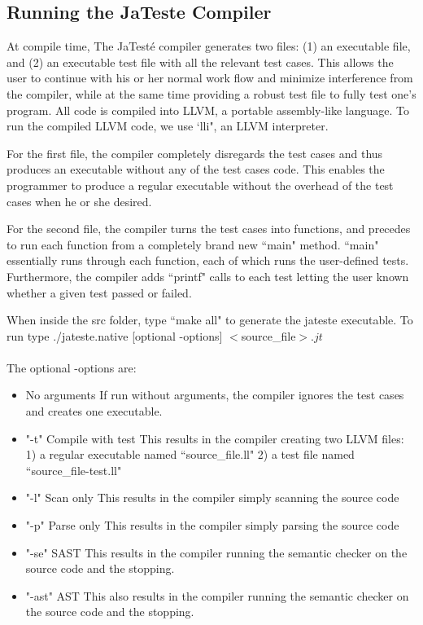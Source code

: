 \documentclass{article}
\begin{document}
\subsection{Running the JaTeste Compiler}
At compile time, The JaTest\'{e} compiler generates two files: (1) an executable file, and (2) an executable test file with all the relevant test cases.  This allows the user to continue with his or her normal work flow and minimize interference from the compiler, while at the same time providing a robust test file to fully test one's program. All code is compiled into LLVM, a portable assembly-like language. To run the compiled LLVM code, we use `lli", an LLVM interpreter. 
\par
For the first file, the compiler completely disregards the test cases and thus produces an executable without any of the test cases code. This enables the programmer to produce a regular executable without the overhead of the test cases when he or she desired. 
\par
For the second file, the compiler turns the test cases into functions, and precedes to run each function from a completely brand new ``main" method. ``main" essentially runs through each function, each of which runs the user-defined tests. Furthermore, the compiler adds ``printf" calls to each test letting the user known whether a given test passed or failed.
\par
When inside the src folder, type ``make all" to generate the jateste executable. To run type ./jateste.native [optional -options] $<$source\_file$>.jt$\\
\\
The optional -options are:
\begin{itemize}
\item{No arguments}
If run without arguments, the compiler ignores the test cases and creates one executable.
\item{"-t" Compile with test}
This results in the compiler creating two LLVM files: 1) a regular executable named ``source\_file.ll" 2) a test file named ``source\_file-test.ll"
\item{"-l" Scan only}
This results in the compiler simply scanning the source code
\item{"-p" Parse only}
This results in the compiler simply parsing the source code
\item{"-se" SAST}
This results in the compiler running the semantic checker on the source code and the stopping.
\item{"-ast" AST}
This also results in the compiler running the semantic checker on the source code and the stopping.
\end{itemize}
\end{document}
